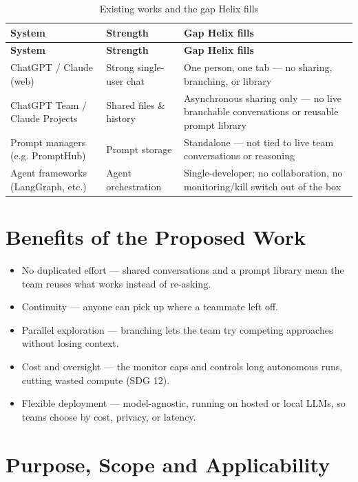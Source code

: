 \documentclass[12pt,a4paper]{report}
\begin{document}
\begingroup
\setlength{\parskip}{0pt}\renewcommand{\arraystretch}{1.32}\footnotesize
\begin{xltabular}{\textwidth}{>{\hsize\raggedright\arraybackslash}X >{\hsize\raggedright\arraybackslash}X >{\hsize\raggedright\arraybackslash}X}
\caption{Existing works and the gap Helix fills}\\
\toprule
\textbf{System} & \textbf{Strength} & \textbf{Gap Helix fills} \\
\midrule\endfirsthead
\toprule
\textbf{System} & \textbf{Strength} & \textbf{Gap Helix fills} \\
\midrule\endhead
\bottomrule\endfoot
ChatGPT / Claude (web) & Strong single-user chat & One person, one tab --- no sharing, branching, or library \\
ChatGPT Team / Claude Projects & Shared files \& history & Asynchronous sharing only --- no live branchable conversations or reusable prompt library \\
Prompt managers (e.g. PromptHub) & Prompt storage & Standalone --- not tied to live team conversations or reasoning \\
Agent frameworks (LangGraph, etc.) & Agent orchestration & Single-developer; no collaboration, no monitoring/kill switch out of the box \\
\end{xltabular}
\endgroup

\section{Benefits of the Proposed Work}
\begin{itemize}
  \item No duplicated effort --- shared conversations and a prompt library mean the team reuses what works instead of re-asking.
  \item Continuity --- anyone can pick up where a teammate left off.
  \item Parallel exploration --- branching lets the team try competing approaches without losing context.
  \item Cost and oversight --- the monitor caps and controls long autonomous runs, cutting wasted compute (SDG 12).
  \item Flexible deployment --- model-agnostic, running on hosted or local LLMs, so teams choose by cost, privacy, or latency.
\end{itemize}

\section{Purpose, Scope and Applicability}
\end{document}

